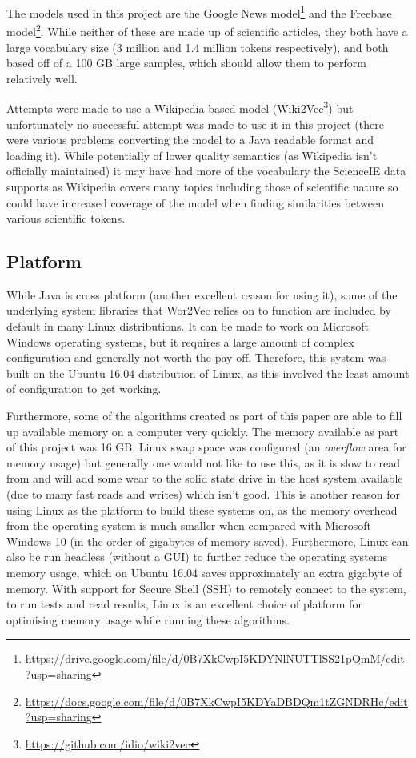 The models used in this project are the Google News model\footnote{\href{https://drive.google.com/file/d/0B7XkCwpI5KDYNlNUTTlSS21pQmM/edit?usp=sharing}{https://drive.google.com/file/d/0B7XkCwpI5KDYNlNUTTlSS21pQmM/edit?usp=sharing}} and the Freebase model\footnote{\href{https://docs.google.com/file/d/0B7XkCwpI5KDYaDBDQm1tZGNDRHc/edit?usp=sharing}{https://docs.google.com/file/d/0B7XkCwpI5KDYaDBDQm1tZGNDRHc/edit?usp=sharing}}. While neither of these are made up of scientific articles, they both have a large vocabulary size (3 million and 1.4 million tokens respectively), and both based off of a 100 GB large samples, which should allow them to perform relatively well. 

Attempts were made to use a Wikipedia based model (Wiki2Vec\footnote{\href{https://github.com/idio/wiki2vec}{https://github.com/idio/wiki2vec}}) but unfortunately no successful attempt was made to use it in this project (there were various problems converting the model to a Java readable format and loading it). While potentially of lower quality semantics (as Wikipedia isn't officially maintained) it may have had more of the vocabulary the ScienceIE data supports as Wikipedia covers many topics including those of scientific nature so could have increased coverage of the model when finding similarities between various scientific tokens. 

\subsection{Platform}
While Java is cross platform (another excellent reason for using it), some of the underlying system libraries that Wor2Vec relies on to function are included by default in many Linux distributions. It can be made to work on Microsoft Windows operating systems, but it requires a large amount of complex configuration and generally not worth the pay off. Therefore, this system was built on the Ubuntu 16.04 distribution of Linux, as this involved the least amount of configuration to get working.

Furthermore, some of the algorithms created as part of this paper are able to fill up available memory on a computer very quickly. The memory available as part of this project was 16 GB. Linux swap space was configured (an \textit{overflow} area for memory usage) but generally one would not like to use this, as it is slow to read from and will add some wear to the solid state drive in the host system available (due to many fast reads and writes) which isn't good. This is another reason for using Linux as the platform to build these systems on, as the memory overhead from the operating system is much smaller when compared with Microsoft Windows 10 (in the order of gigabytes of memory saved). Furthermore, Linux can also be run headless (without a GUI) to further reduce the operating systems memory usage, which on Ubuntu 16.04 saves approximately an extra gigabyte of memory. With support for Secure Shell (SSH) to remotely connect to the system, to run tests and read results, Linux is an excellent choice of platform for optimising memory usage while running these algorithms.
